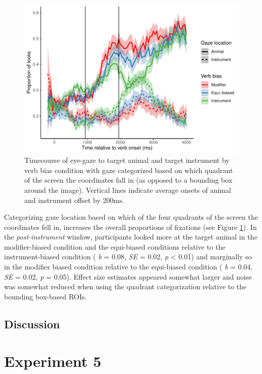 \documentclass[
  man,floatsintext]{apa6}
\begin{document}
\begin{figure}
\centering
\includegraphics{manuscript_files/figure-latex/E4-gaze-timecourse-fig-quadrants-1.pdf}
\caption{\label{fig:E4-gaze-timecourse-fig-quadrants}Timecourse of eye-gaze to target animal and target instrument by verb bias condition with gaze categorized based on which quadrant of the screen the coordinates fall in (as opposed to a bounding box around the image). Vertical lines indicate average onsets of animal and instrument offset by 200ms.}
\end{figure}

Categorizing gaze location based on which of the four quadrants of the screen the coordinates fell in, increases the overall proportions of fixations (see Figure \ref{fig:E4-gaze-timecourse-fig-quadrants}). In the \emph{post-instrument} window, participants looked more at the target animal in the modifier-biased condition and the equi-biased conditions relative to the instrument-biased condition ( \emph{b} = 0.08, \emph{SE} = 0.02, \emph{p} \textless{} 0.01) and marginally so in the modifier biased condition relative to the equi-biased condition ( \emph{b} = 0.04, \emph{SE} = 0.02, \emph{p} = 0.05). Effect size estimates appeared somewhat larger and noise was somewhat reduced when using the quadrant categorization relative to the bounding box-based ROIs.

\hypertarget{discussion-3}{%
\subsection{Discussion}\label{discussion-3}}

\hypertarget{experiment-5}{%
\section{Experiment 5}\label{experiment-5}}
\end{document}
